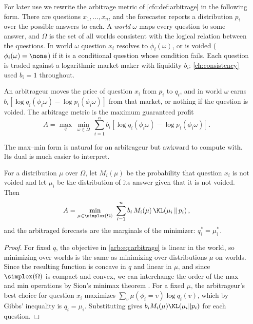 \begin{draftblock}
For later use we rewrite the arbitrage metric of \cref{cfc:def:arbitrage} in the following form. There are questions $x_1,\dots,x_n$, and the forecaster reports a distribution $p_i$ over the possible answers to each. A \emph{world} $\omega$ maps every question to some answer, and $\Omega$ is the set of all worlds consistent with the logical relation between the questions. In world $\omega$ question $x_i$ resolves to $\phi_i(\omega)$, or is voided ($\phi_i(\omega)=\none$) if it is a conditional question whose condition fails. Each question is traded against a logarithmic market maker with liquidity $b_i$; \cref{ch:consistency} used $b_i=1$ throughout.

An arbitrageur moves the price of question $x_i$ from $p_i$ to $q_i$, and in world $\omega$ earns $b_i\left[\log q_i(\phi_i\omega)-\log p_i(\phi_i\omega)\right]$ from that market, or nothing if the question is voided. The arbitrage metric is the maximum guaranteed profit
\begin{equation}\label{arb:eq:arbitrage}
A=\max_{q}\ \min_{\omega\in\Omega}\ \sum_{i=1}^n b_i\left[\log q_i(\phi_i\omega)-\log p_i(\phi_i\omega)\right].
\end{equation}

The max--min form is natural for an arbitrageur but awkward to compute with. Its dual is much easier to interpret.

\begin{proposition}\label{arb:prop:dual}
For a distribution $\mu$ over $\Omega$, let $M_i(\mu)$ be the probability that question $x_i$ is not voided and let $\mu_i$ be the distribution of its answer given that it is not voided. Then
\begin{equation}\label{arb:eq:dual}
A=\min_{\mu\in\simplex(\Omega)}\ \sum_{i=1}^n b_i\,M_i(\mu)\,\KL\!\left(\mu_i\,\|\,p_i\right),
\end{equation}
and the arbitraged forecasts are the marginals of the minimizer: $q^*_i=\mu^*_i$.
\end{proposition}

\begin{proof}
For fixed $q$, the objective in \eqref{arb:eq:arbitrage} is linear in the world, so minimizing over worlds is the same as minimizing over distributions $\mu$ on worlds. Since the resulting function is concave in $q$ and linear in $\mu$, and since $\simplex(\Omega)$ is compact and convex, we can interchange the order of the max and min operations by Sion's minimax theorem \citep{sionGeneralMinimaxTheorems1958}. For a fixed $\mu$, the arbitrageur's best choice for question $x_i$ maximizes $\sum_v \mu(\phi_i=v)\log q_i(v)$, which by Gibbs' inequality is $q_i=\mu_i$. Substituting gives $b_iM_i(\mu)\KL(\mu_i\|p_i)$ for each question.
\end{proof}


\end{draftblock}
